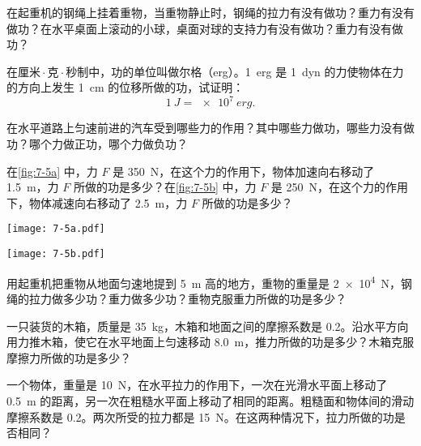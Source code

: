 \begin{Practice}
\begin{question}
  \item 在起重机的钢绳上挂着重物，当重物静止时，钢绳的拉力有没有做功？重力有没有做功？在水平桌面上滚动的小球，桌面对球的支持力有没有做功？重力有没有做功？
  \item 在厘米\,$\cdot$\,克\,$\cdot$\,秒制中，功的单位叫做尔格（\unit{erg}）。\qty{1}{erg} 是 \qty{1}{dyn} 的力使物体在力的方向上发生 \qty{1}{cm} 的位移所做的功，试证明：
  \[\qty{1}{J}=\qty{e7}{erg}.\]
  \item 在水平道路上匀速前进的汽车受到哪些力的作用？其中哪些力做功，哪些力没有做功？哪个力做正功，哪个力做负功？
  \item 在\cref{fig:7-5a} 中，力 $F$ 是 \qty{350}{N}，在这个力的作用下，物体加速向右移动了 \qty{1.5}{m}，力 $F$ 所做的功是多少？在\cref{fig:7-5b} 中，力 $F$ 是 \qty{250}{N}，在这个力的作用下，物体减速向右移动了 \qty{2.5}{m}，力 $F$ 所做的功是多少？
\begin{figurehere}
  \nextfloat
  \begin{minipage}{\linewidth}\centering
    \begin{minipage}[b]{0.48\linewidth}\centering
      \texttt{[image: 7-5a.pdf]}
      \subcaption{}\label{fig:7-5a}
    \end{minipage}
    \begin{minipage}[b]{0.48\linewidth}\centering
      \texttt{[image: 7-5b.pdf]}
      \subcaption{}\label{fig:7-5b}
    \end{minipage}
    \caption{}\label{fig:7-5}
  \end{minipage}
\end{figurehere}

  \item 用起重机把重物从地面匀速地提到 \qty{5}{m} 高的地方，重物的重量是 \qty{2e4}{N}，钢绳的拉力做多少功？重力做多少功？重物克服重力所做的功是多少？
  \item 一只装货的木箱，质量是 \qty{35}{kg}，木箱和地面之间的摩擦系数是 0.2。沿水平方向用力推木箱，使它在水平地面上匀速移动 \qty{8.0}{m}，推力所做的功是多少？木箱克服摩擦力所做的功是多少？
  \item 一个物体，重量是 \qty{10}{N}，在水平拉力的作用下，一次在光滑水平面上移动了 \qty{0.5}{m} 的距离，另一次在粗糙水平面上移动了相同的距离。粗糙面和物体间的滑动摩擦系数是 0.2。两次所受的拉力都是 \qty{15}{N}。在这两种情况下，拉力所做的功是否相同？
\end{question}
\end{Practice}

